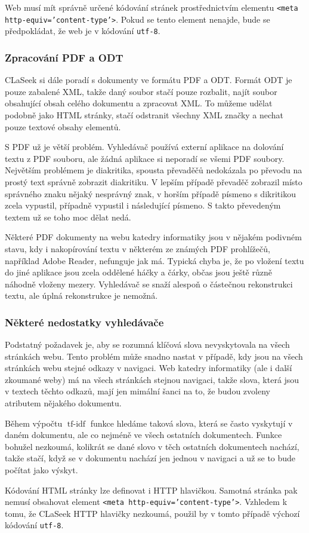 \documentclass[12pt]{article}
\newcommand{\name}{CLaSeek}
\newcommand{\code}[1]{\texttt{#1}}
\newcommand{\sssection}[1]{\subsubsection{#1}}
\DeclareMathOperator{\tfidf}{tf-idf}
\begin{document}
Web musí mít správně určené kódování stránek prostřednictvím elementu \code{<meta http-equiv='content-type'>}. Pokud se tento element nenajde, bude se předpokládat, že web je v kódování \code{utf-8}. 

\sssection{Zpracování PDF a ODT}
\name{} si dále poradí s dokumenty ve formátu PDF a ODT. Formát ODT je pouze zabalené XML, takže daný soubor stačí pouze rozbalit, najít soubor obsahující obsah celého dokumentu a zpracovat XML. To můžeme udělat podobně jako HTML stránky, stačí odstranit všechny XML značky a nechat pouze textové obsahy elementů. 

S PDF už je větší problém. Vyhledávač používá externí aplikace na dolování textu z PDF souboru, ale žádná aplikace si neporadí se všemi PDF soubory. Největším problémem je diakritika, spousta převaděčů nedokázala po převodu na prostý text správně zobrazit diakritiku. V lepším případě převaděč zobrazil místo správného znaku nějaký nesprávný znak, v horším případě písmeno s dikritikou zcela vypustil, případně vypustil i následující písmeno. S takto převedeným textem už se toho moc dělat nedá. 

Některé PDF dokumenty na webu katedry informatiky jsou v nějakém podivném stavu, kdy i nakopírování textu v některém ze známých PDF prohlížečů, například Adobe Reader, nefunguje jak má. Typická chyba je, že po vložení textu do jiné aplikace jsou zcela oddělené háčky a čárky, občas jsou ještě různě náhodně vloženy mezery. Vyhledávač se snaží alespoň o částečnou rekonstrukci textu, ale úplná rekonstrukce je nemožná. 

\sssection{Některé nedostatky vyhledávače}\label{ch.nedostatky}

Podstatný požadavek je, aby se rozumná klíčová slova nevyskytovala na všech stránkách webu. Tento problém může snadno nastat v případě, kdy jsou na všech stránkách webu stejné odkazy v navigaci. Web katedry informatiky (ale i další zkoumané weby) má na všech stránkách stejnou navigaci, takže slova, která jsou v textech těchto odkazů, mají jen mimální šanci na to, že budou zvoleny atributem nějakého dokumentu. 

Během výpočtu $\tfidf$ funkce hledáme taková slova, která se často vyskytují v daném dokumentu, ale co nejméně ve všech ostatních dokumentech. Funkce bohužel nezkoumá, kolikrát se dané slovo v těch ostatních dokumentech nachází, takže stačí, když se v dokumentu nachází jen jednou v navigaci a už se to bude počítat jako výskyt. 

Kódování HTML stránky lze definovat i HTTP hlavičkou. Samotná stránka pak nemusí obsahovat element \code{<meta http-equiv='content-type'>}. Vzhledem k tomu, že \name{} HTTP hlavičky nezkoumá, použil by v tomto případě výchozí kódování \code{utf-8}. 
\end{document}
